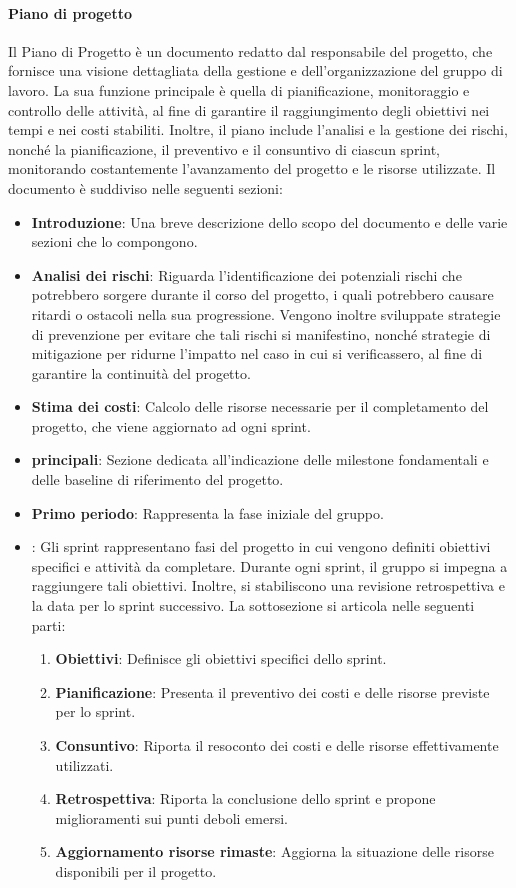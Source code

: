 \paragraph{Piano di progetto}
Il Piano di Progetto è un documento redatto dal responsabile del progetto, che fornisce una visione dettagliata della gestione e dell’organizzazione del gruppo di lavoro. La sua funzione principale è quella di pianificazione, monitoraggio e controllo delle attività, al fine di garantire il raggiungimento degli obiettivi nei tempi e nei costi stabiliti. Inoltre, il piano include l'analisi e la gestione dei rischi, nonché la pianificazione, il preventivo e il consuntivo di ciascun sprint, monitorando costantemente l'avanzamento del progetto e le risorse utilizzate.
Il documento è suddiviso nelle seguenti sezioni:
\begin{itemize}
    \item \textbf{Introduzione}: Una breve descrizione dello scopo del documento e delle varie sezioni che lo compongono.
    \item \textbf{Analisi dei rischi}: Riguarda l'identificazione dei potenziali rischi che potrebbero sorgere durante il corso del progetto, i quali potrebbero causare ritardi o ostacoli nella sua progressione. Vengono inoltre sviluppate strategie di prevenzione per evitare che tali rischi si manifestino, nonché strategie di mitigazione per ridurne l'impatto nel caso in cui si verificassero, al fine di garantire la continuità del progetto.
    \item \textbf{Stima dei costi}: Calcolo delle risorse necessarie per il completamento del progetto, che viene aggiornato ad ogni sprint.
    \item \textbf{ principali}: Sezione dedicata all'indicazione delle milestone fondamentali e delle baseline di riferimento del progetto.
    \item \textbf{Primo periodo}: Rappresenta la fase iniziale del gruppo.
    \item \textbf{}: Gli sprint rappresentano fasi del progetto in cui vengono definiti obiettivi specifici e attività da completare. Durante ogni sprint, il gruppo si impegna a raggiungere tali obiettivi. Inoltre, si stabiliscono una revisione retrospettiva e la data per lo sprint successivo.
    La sottosezione si articola nelle seguenti parti:
    \begin{enumerate}
        \item \textbf{Obiettivi}: Definisce gli obiettivi specifici dello sprint.
        \item \textbf{Pianificazione}: Presenta il preventivo dei costi e delle risorse previste per lo sprint.
        \item \textbf{Consuntivo}: Riporta il resoconto dei costi e delle risorse effettivamente utilizzati.
        \item \textbf{Retrospettiva}: Riporta la conclusione dello sprint e propone miglioramenti sui punti deboli emersi.
        \item \textbf{Aggiornamento risorse rimaste}: Aggiorna la situazione delle risorse disponibili per il progetto.
    \end{enumerate}
\end{itemize}

